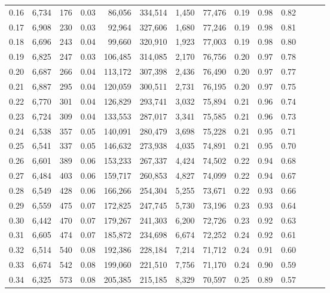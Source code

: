 \begin{tabular}{rrrrrrrrrrrrrr}
0.16 &  6,734 &    176 &  0.03 &   86,056 &  334,514 &   1,450 &  77,476 &  0.19 &  0.98 &      0.82 \\
0.17 &  6,908 &    230 &  0.03 &   92,964 &  327,606 &   1,680 &  77,246 &  0.19 &  0.98 &      0.81 \\
0.18 &  6,696 &    243 &  0.04 &   99,660 &  320,910 &   1,923 &  77,003 &  0.19 &  0.98 &      0.80 \\
0.19 &  6,825 &    247 &  0.03 &  106,485 &  314,085 &   2,170 &  76,756 &  0.20 &  0.97 &      0.78 \\
0.20 &  6,687 &    266 &  0.04 &  113,172 &  307,398 &   2,436 &  76,490 &  0.20 &  0.97 &      0.77 \\
0.21 &  6,887 &    295 &  0.04 &  120,059 &  300,511 &   2,731 &  76,195 &  0.20 &  0.97 &      0.75 \\
0.22 &  6,770 &    301 &  0.04 &  126,829 &  293,741 &   3,032 &  75,894 &  0.21 &  0.96 &      0.74 \\
0.23 &  6,724 &    309 &  0.04 &  133,553 &  287,017 &   3,341 &  75,585 &  0.21 &  0.96 &      0.73 \\
0.24 &  6,538 &    357 &  0.05 &  140,091 &  280,479 &   3,698 &  75,228 &  0.21 &  0.95 &      0.71 \\
0.25 &  6,541 &    337 &  0.05 &  146,632 &  273,938 &   4,035 &  74,891 &  0.21 &  0.95 &      0.70 \\
0.26 &  6,601 &    389 &  0.06 &  153,233 &  267,337 &   4,424 &  74,502 &  0.22 &  0.94 &      0.68 \\
0.27 &  6,484 &    403 &  0.06 &  159,717 &  260,853 &   4,827 &  74,099 &  0.22 &  0.94 &      0.67 \\
0.28 &  6,549 &    428 &  0.06 &  166,266 &  254,304 &   5,255 &  73,671 &  0.22 &  0.93 &      0.66 \\
0.29 &  6,559 &    475 &  0.07 &  172,825 &  247,745 &   5,730 &  73,196 &  0.23 &  0.93 &      0.64 \\
0.30 &  6,442 &    470 &  0.07 &  179,267 &  241,303 &   6,200 &  72,726 &  0.23 &  0.92 &      0.63 \\
0.31 &  6,605 &    474 &  0.07 &  185,872 &  234,698 &   6,674 &  72,252 &  0.24 &  0.92 &      0.61 \\
0.32 &  6,514 &    540 &  0.08 &  192,386 &  228,184 &   7,214 &  71,712 &  0.24 &  0.91 &      0.60 \\
0.33 &  6,674 &    542 &  0.08 &  199,060 &  221,510 &   7,756 &  71,170 &  0.24 &  0.90 &      0.59 \\
0.34 &  6,325 &    573 &  0.08 &  205,385 &  215,185 &   8,329 &  70,597 &  0.25 &  0.89 &      0.57 \\

\end{tabular}
